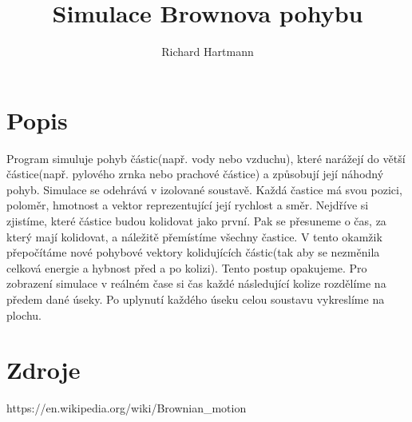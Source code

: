 \documentclass[a4paper, 12pt]{article}
\title{Simulace Brownova pohybu}
\author{Richard Hartmann}
\begin{document}
    \maketitle
    \section*{Popis}
    Program simuluje pohyb částic(např. vody nebo vzduchu), které narážejí do větší částice(např. pylového zrnka nebo prachové částice) a způsobují její náhodný pohyb. Simulace se odehrává v izolované soustavě.
    \newline
    Každá častice má svou pozici, poloměr, hmotnost a vektor reprezentující její rychlost a směr.
    \newline
    Nejdříve si zjistíme, které částice budou kolidovat jako první. Pak se přesuneme o čas, za který mají kolidovat,  a náležitě přemístíme všechny častice. V tento okamžik přepočítáme nové pohybové vektory kolidujících částic(tak aby se nezměnila celková energie a hybnost před a po kolizi). Tento postup opakujeme.
    \newline
    Pro zobrazení simulace v reálném čase si čas každé následující kolize rozdělíme na předem dané úseky. Po uplynutí každého úseku celou soustavu vykreslíme na plochu.
    \section*{Zdroje}
    https://en.wikipedia.org/wiki/Brownian\_motion
\end{document}
